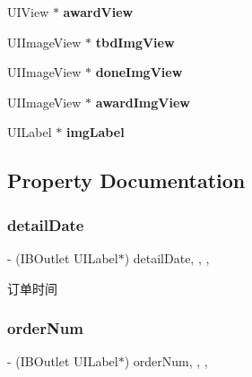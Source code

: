 \begin{DoxyCompactItemize}
U\+I\+View $\ast$ {\bfseries award\+View}
\item 
\mbox{\label{interface_order_list_cell_af3cc8be9af818bf22a0b7188c6978246}} 
U\+I\+Image\+View $\ast$ {\bfseries tbd\+Img\+View}
\item 
\mbox{\label{interface_order_list_cell_acd921379777319c0584d9157fedca398}} 
U\+I\+Image\+View $\ast$ {\bfseries done\+Img\+View}
\item 
\mbox{\label{interface_order_list_cell_aeb9410a828f0a94b04de7a31f49a570e}} 
U\+I\+Image\+View $\ast$ {\bfseries award\+Img\+View}
\item 
\mbox{\label{interface_order_list_cell_aaf3d7de6964389e034661e6a5adee140}} 
U\+I\+Label $\ast$ {\bfseries img\+Label}
\end{DoxyCompactItemize}


\subsection{Property Documentation}
\mbox{\label{interface_order_list_cell_a14fb3c804ee59ead288729ea172e8e1f}} 
\subsubsection{\texorpdfstring{detail\+Date}{detailDate}}
{\footnotesize\ttfamily -\/ (I\+B\+Outlet U\+I\+Label$\ast$) detail\+Date\hspace{0.3cm}{\ttfamily [read]}, {\ttfamily [write]}, {\ttfamily [nonatomic]}, {\ttfamily [weak]}}

订单时间 \mbox{\label{interface_order_list_cell_aa5bb1c72b36a4d9163deb932de6dabd0}} 
\subsubsection{\texorpdfstring{order\+Num}{orderNum}}
{\footnotesize\ttfamily -\/ (I\+B\+Outlet U\+I\+Label$\ast$) order\+Num\hspace{0.3cm}{\ttfamily [read]}, {\ttfamily [write]}, {\ttfamily [nonatomic]}, {\ttfamily [weak]}}

